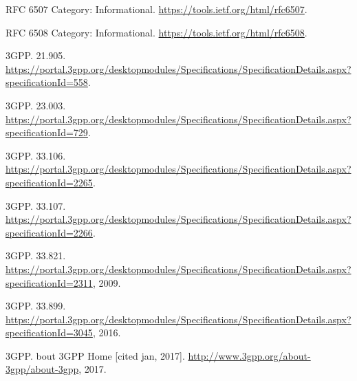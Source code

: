 \documentclass{river-journal}
\begin{document}





\nocite{*} %


%

\begin{thebibliography}{10}

{RFC} 6507 {C}ategory: {I}nformational.
\newblock \url{https://tools.ietf.org/html/rfc6507}.

{RFC} 6508 {C}ategory: {I}nformational.
\newblock \url{https://tools.ietf.org/html/rfc6508}.

3GPP.
 21.905.
\newblock
  \url{https://portal.3gpp.org/desktopmodules/Specifications/SpecificationDetails.aspx?specificationId=558}.

3GPP.
 23.003.
\newblock
  \url{https://portal.3gpp.org/desktopmodules/Specifications/SpecificationDetails.aspx?specificationId=729}.

3GPP.
 33.106.
\newblock
  \url{https://portal.3gpp.org/desktopmodules/Specifications/SpecificationDetails.aspx?specificationId=2265}.

3GPP.
 33.107.
\newblock
  \url{https://portal.3gpp.org/desktopmodules/Specifications/SpecificationDetails.aspx?specificationId=2266}.

3GPP.
 33.821.
\newblock
  \url{https://portal.3gpp.org/desktopmodules/Specifications/SpecificationDetails.aspx?specificationId=2311},
  2009.

3GPP.
 33.899.
\newblock
  \url{https://portal.3gpp.org/desktopmodules/Specifications/SpecificationDetails.aspx?specificationId=3045},
  2016.

3GPP.
bout {3GPP} {H}ome [cited jan, 2017].
\newblock \url{http://www.3gpp.org/about-3gpp/about-3gpp}, 2017.


\end{thebibliography}
\end{document}
